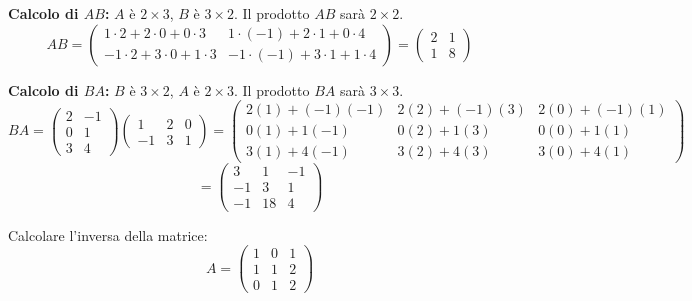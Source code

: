 \begin{solbox}
\textbf{Calcolo di $AB$:}
$A$ è $2 \times 3$, $B$ è $3 \times 2$. Il prodotto $AB$ sarà $2 \times 2$.
$$ AB = \begin{pmatrix} 1\cdot 2 + 2\cdot 0 + 0\cdot 3 & 1\cdot(-1) + 2\cdot 1 + 0\cdot 4 \\ -1\cdot 2 + 3\cdot 0 + 1\cdot 3 & -1\cdot(-1) + 3\cdot 1 + 1\cdot 4 \end{pmatrix} 
= \begin{pmatrix} 2 & 1 \\ 1 & 8 \end{pmatrix} $$

\textbf{Calcolo di $BA$:}
$B$ è $3 \times 2$, $A$ è $2 \times 3$. Il prodotto $BA$ sarà $3 \times 3$.
$$ BA = \begin{pmatrix} 2 & -1 \\ 0 & 1 \\ 3 & 4 \end{pmatrix} \begin{pmatrix} 1 & 2 & 0 \\ -1 & 3 & 1 \end{pmatrix} =
\begin{pmatrix} 
2(1)+(-1)(-1) & 2(2)+(-1)(3) & 2(0)+(-1)(1) \\
0(1)+1(-1) & 0(2)+1(3) & 0(0)+1(1) \\
3(1)+4(-1) & 3(2)+4(3) & 3(0)+4(1)
\end{pmatrix} $$
$$ = \begin{pmatrix} 3 & 1 & -1 \\ -1 & 3 & 1 \\ -1 & 18 & 4 \end{pmatrix} $$
\end{solbox}

\begin{exercisebox}[title={Esercizio 2: Inversa con Gauss-Jordan}]
Calcolare l'inversa della matrice:
$$ A = \begin{pmatrix} 1 & 0 & 1 \\ 1 & 1 & 2 \\ 0 & 1 & 2 \end{pmatrix} $$
\end{exercisebox}

